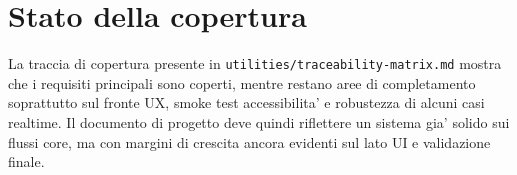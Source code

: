 \section{Stato della copertura}

La traccia di copertura presente in \texttt{utilities/traceability-matrix.md} mostra che i requisiti principali sono coperti, mentre restano aree di completamento soprattutto sul fronte UX, smoke test accessibilita' e robustezza di alcuni casi realtime. Il documento di progetto deve quindi riflettere un sistema gia' solido sui flussi core, ma con margini di crescita ancora evidenti sul lato UI e validazione finale.
